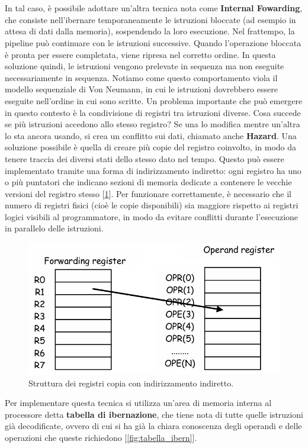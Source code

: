 \\
\\
In tal caso, è possibile adottare un'altra tecnica nota come \textbf{Internal Fowarding}, che consiste nell'ibernare temporaneamente le istruzioni bloccate (ad esempio in attesa di dati dalla memoria), sospendendo la loro esecuzione. Nel frattempo, la pipeline può continuare con le istruzioni successive. Quando l'operazione bloccata è pronta per essere completata, viene ripresa nel corretto ordine. In questa soluzione quindi, le istruzioni vengono prelevate in sequenza ma non eseguite necessariamente in sequenza. Notiamo come questo comportamento viola il modello sequenziale di Von Neumann, in cui le istruzioni dovrebbero essere eseguite nell'ordine in cui sono scritte. Un problema importante che può emergere in questo contesto è la condivisione di registri tra istruzioni diverse. Cosa succede se più istruzioni accedono allo stesso registro? Se una lo modifica mentre un'altra lo sta ancora usando, si crea un conflitto sui dati, chiamato anche \textbf{Hazard}.  Una soluzione possibile è quella di creare più copie del registro coinvolto, in modo da tenere traccia dei diversi stati dello stesso dato nel tempo. Questo può essere implementato tramite una forma di indirizzamento indiretto: ogni registro ha uno o più puntatori che indicano sezioni di memoria dedicate a contenere le vecchie versioni del registro stesso [\ref{fig:reg_copia}]. Per funzionare correttamente, è necessario che il numero di registri fisici (cioè le copie disponibili) sia maggiore rispetto ai registri logici visibili al programmatore, in modo da evitare conflitti durante l'esecuzione in parallelo delle istruzioni.
\begin{figure}[!h]
    \centering
    \includegraphics[width=0.4\linewidth]{img/registri_copia1.png}
    \caption{Struttura dei registri copia con indirizzamento indiretto.}
    \label{fig:reg_copia}
\end{figure}
Per implementare questa tecnica si utilizza un'area di memoria interna al processore detta \textbf{tabella di ibernazione}, che tiene nota di tutte quelle istruzioni già decodificate, ovvero di cui si ha già la chiara conoscenza degli operandi e delle operazioni che queste richiedono [\ref{fig:tabella_ibern}]. 
